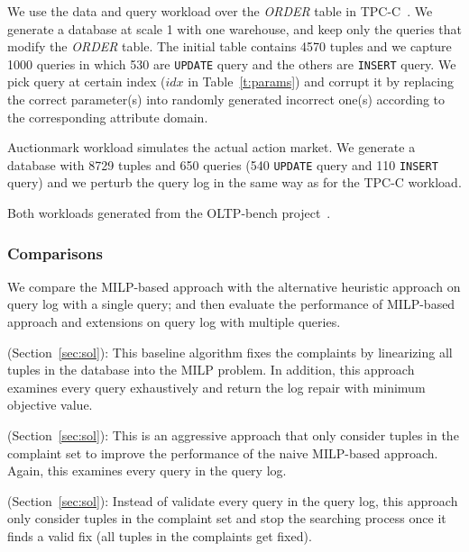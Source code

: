 { \color{blue}
 We use the data and query workload over the {\it
ORDER} table in TPC-C~\cite{}.  We generate a database at scale
1 with one warehouse, and keep only the queries that modify the
{\it ORDER} table. The initial table contains 4570 tuples and we capture 
1000 queries in which 530 are \texttt{UPDATE} query and the others
are \texttt{INSERT} query. 
We pick query at certain index ($idx$ in Table~\ref{t:params}) 
and corrupt it by replacing the correct parameter(s) into randomly 
generated incorrect one(s) according to the corresponding attribute domain. 

 Auctionmark workload simulates the 
actual action market. We generate a database 
with 8729 tuples and 650 queries (540 \texttt{UPDATE} query and 110 \texttt{INSERT} query) 
and we perturb the query log in the same way as for the TPC-C workload.

Both workloads generated from the OLTP-bench project~\cite{oltpbench,oltpbenchgit}.

\subsubsection{Comparisons}
We compare the MILP-based approach with the alternative heuristic approach
on query log with a single query; and then evaluate
the performance of MILP-based approach and extensions on query log
with multiple queries. 

\smallskip

\noindent \milpall (Section~\ref{sec:sol}): This baseline algorithm 
fixes the complaints by linearizing 
all tuples in the database into the MILP problem. In addition, this approach 
examines every query exhaustively and return the log repair with minimum
objective value.

\noindent \milptuple (Section~\ref{sec:sol}): This is an aggressive approach 
that only consider tuples in the complaint set to improve the performance of
the naive MILP-based approach. Again, this examines every query in the query log. 

\smallskip

\noindent \milptuplestopearly (Section~\ref{sec:sol}): Instead of validate every
query in the query log, this approach only consider tuples in the complaint set
and stop the searching process once it finds a valid fix (all tuples in the 
complaints get fixed). 

}
